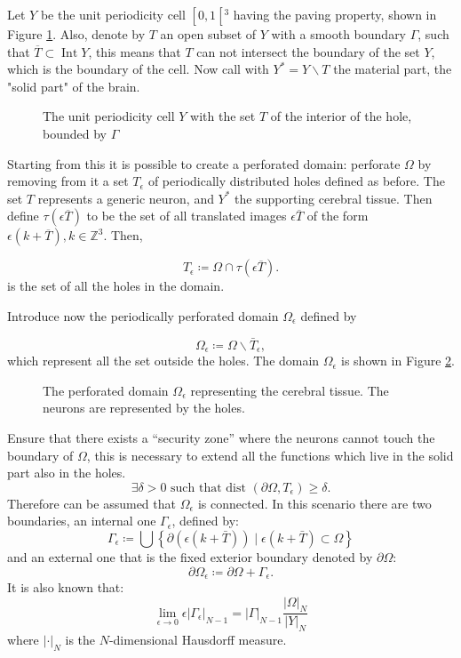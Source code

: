 Let $Y$ be the unit periodicity cell $\left[0,1\left[{ }^{3}\right.\right.$ having the paving property, shown in Figure \ref{fig:unit_cell}. 
Also, denote by $T$ an open subset of $Y$ with a smooth boundary $\Gamma$, such that $\overline{T} \subset \operatorname{Int} Y$, this means that $T$ can not intersect the boundary of the set $Y$, which is the boundary of the cell. Now call with $Y^{*}=Y \backslash T$ the material part, the "solid part" of the brain. 
\begin{figure}[H]
    \centering
    \caption{The unit periodicity cell $Y$ with the set $T$ of the interior of the hole, bounded by \(\Gamma\)}
    \label{fig:unit_cell}
  \end{figure}

Starting from this it is possible to create a perforated domain: perforate $\Omega$ by removing from it a set $T_{\epsilon}$ of periodically distributed holes defined as before. The set $T$ represents a generic neuron, and $Y^{*}$ the supporting cerebral tissue. Then define $\tau(\epsilon \overline{T})$ to be the set of all translated images $\epsilon \overline{T}$ of the form $\epsilon(k+\overline{T}), k \in \mathbb{Z}^{3}$. Then,

\[ T_{\epsilon} \coloneqq \Omega \cap \tau(\epsilon \overline{T}) . \] is the set of all the holes in the domain.

Introduce now the periodically perforated domain $\Omega_{\epsilon}$ defined by

$$
\Omega_{\epsilon} \coloneqq \Omega \backslash \bar{T}_{\epsilon},
$$
which represent all the set outside the holes. The domain $\Omega_{\epsilon}$ is shown in Figure \ref{fig:perforated_domain}.
\begin{figure}[H]
    \centering
    \caption{The perforated domain $\Omega_\epsilon$ representing the cerebral tissue. The neurons are represented by the holes.}
    \label{fig:perforated_domain}
  \end{figure}

Ensure that there exists a ``security zone'' where the neurons cannot touch the boundary of \(\Omega\), this is necessary to extend all the functions which live in the solid part also in the holes.
\begin{equation}
  \exists \delta>0 \text { such that dist }\left(\partial\Omega, T_{\epsilon}\right)\geq\delta.
\label{eq:security_zone}
\end{equation}
Therefore can be assumed that $\Omega_{\epsilon}$ is connected. In this scenario there are two boundaries, an internal one $\Gamma_{\epsilon}$, defined by:
$$
\Gamma_{\epsilon} \coloneqq \bigcup\left\{\partial(\epsilon(k+\bar{T})) \mid \epsilon(k+\bar{T}) \subset \Omega\right\}
$$
and an external one that is the fixed exterior boundary denoted by $\partial \Omega$:
$$
\partial\Omega_{\epsilon}\coloneqq\partial\Omega+\Gamma_{\epsilon}.
$$
It is also known that:
\begin{equation}
  \lim _{\epsilon \rightarrow 0} \epsilon\left|\Gamma_{\epsilon}\right|_{N-1}=|\Gamma|_{N-1} \frac{|\Omega|_{N}}{|Y|_{N}}
\label{eq:limit_gamma_eps}
\end{equation}
where $|\cdot|_{N}$ is the $N$-dimensional Hausdorff measure.

